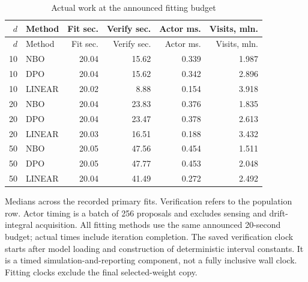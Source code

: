 \begingroup\small\setlength{\tabcolsep}{4pt}
\begin{longtable}{rlrrrr}
\caption{Actual work at the announced fitting budget}\label{tab:r12cost}\\
\toprule
$d$ & Method & Fit sec. & Verify sec. & Actor ms. & Visits, mln.\\\midrule
\endfirsthead
\toprule
$d$ & Method & Fit sec. & Verify sec. & Actor ms. & Visits, mln.\\\midrule
\endhead
10 & NBO & 20.04 & 15.62 & 0.339 & 1.987\\
10 & DPO & 20.04 & 15.62 & 0.342 & 2.896\\
10 & LINEAR & 20.02 & 8.88 & 0.154 & 3.918\\
20 & NBO & 20.04 & 23.83 & 0.376 & 1.835\\
20 & DPO & 20.04 & 23.47 & 0.378 & 2.613\\
20 & LINEAR & 20.03 & 16.51 & 0.188 & 3.432\\
50 & NBO & 20.05 & 47.56 & 0.454 & 1.511\\
50 & DPO & 20.05 & 47.77 & 0.453 & 2.048\\
50 & LINEAR & 20.04 & 41.49 & 0.272 & 2.492\\
\bottomrule\end{longtable}
\noindent Medians across the recorded primary fits. Verification refers to the population row. Actor timing is a batch of 256 proposals and excludes sensing and drift-integral acquisition. All fitting methods use the same announced 20-second budget; actual times include iteration completion. The saved verification clock starts after model loading and construction of deterministic interval constants. It is a timed simulation-and-reporting component, not a fully inclusive wall clock. Fitting clocks exclude the final selected-weight copy.
\endgroup

